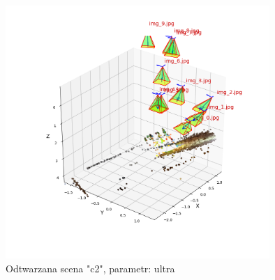 \begin{figure}[h]
   \centering
   \includegraphics[width=10cm]{preset_c2/ultra.png}
   \caption{Odtwarzana scena "c2", parametr: ultra}
   \label {fig:preset_c2_ultra}
\end{figure}

